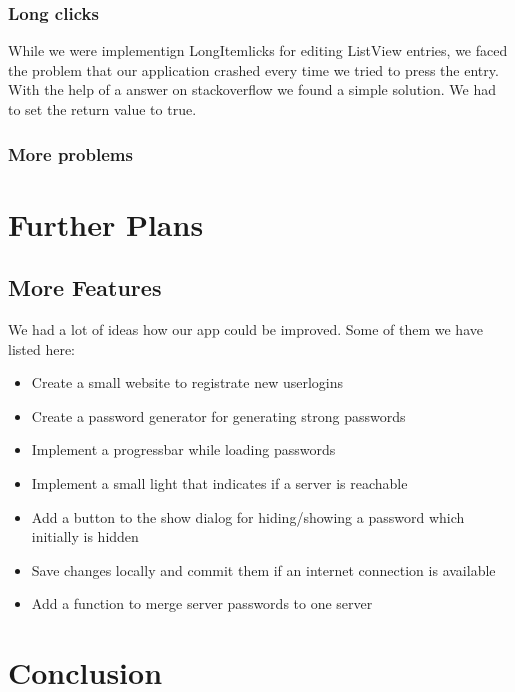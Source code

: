\documentclass{report}
\begin{document}
\subsubsection{Long clicks}
While we were implementign LongItemlicks for editing ListView entries, we faced the problem that our application crashed every time we tried to press the entry. With the help of a answer on stackoverflow  we found a simple solution. We had to set the return value to true.
\subsubsection{More problems}

\section{Further Plans}
\subsection{More Features}
We had a lot of ideas how our app could be improved. Some of them we have listed here:
\begin{itemize}
         \item Create a small website to registrate new userlogins
         \item Create a password generator for generating strong passwords
         \item Implement a progressbar while loading passwords
         \item Implement a small light that indicates if a server is reachable
         \item Add a button to the show dialog for hiding/showing a password which initially is hidden
         \item Save changes locally and commit them if an internet connection is available
         \item Add a function to merge server passwords to one server
      \end{itemize}
 
\subsection{}

\section{Conclusion}




\end{document}
